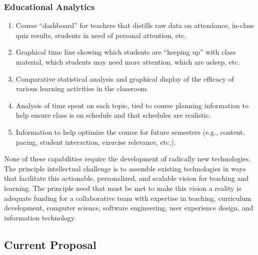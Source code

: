 \documentclass{article}
\begin{document}
\subsubsection{Educational Analytics}
\begin{enumerate}
\item Course ``dashboard'' for teachers that distills raw data on attendance, in-class
  quiz results, students in need of personal attention, etc.
\item Graphical time line showing which students are ``keeping up'' with class
  material, which students may need more attention, which are asleep, etc.
\item Comparative statistical analysis and graphical display
  of the efficacy of various learning activities in the classroom.
\item Analysis of time spent on each topic, tied to course planning information to help
  ensure class is on schedule and that schedules are realistic.
\item Information to help optimize the course for future semesters
  (e.g., content, pacing, student interaction, exercise relevance, etc.).
\end{enumerate}

None of these capabilities require the development of radically new technologies.
The principle intellectual challenge is to assemble existing technologies
in ways that facilitate this actionable, personalized, and scalable vision for
teaching and learning.
The principle need that must be met to make this vision a reality
is adequate funding for a collaborative team with expertise in
teaching,
curriculum development,
computer science,
software engineering,
user experience design,
and information technology.

\subsection{Current Proposal}
\label{sec:current-proposal}
\end{document}
